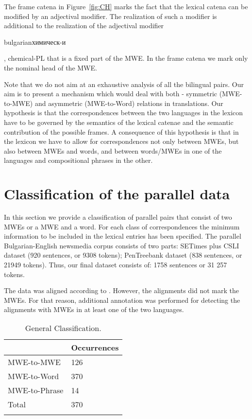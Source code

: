 \documentclass[output=paper]{langsci/langscibook}
\begin{document}
The frame catena in Figure~\ref{fig:CH} marks the fact that the lexical catena
can be modified by an adjectival modifier. The realization of such a modifier is additional to the realization of the adjectival modifier 
\begin{otherlanguage*}{bulgarian}химическ-и\end{otherlanguage*}, chemical-\textsc{PL}
that is a fixed part of the MWE. In the frame catena we mark only the nominal head of the MWE.

Note that we do not aim at an exhaustive analysis of all the bilingual
pairs. Our aim is to present a mechanism which would deal with both -
symmetric (MWE-to-MWE) and asymmetric (MWE-to-Word) relations in
translations. Our hypothesis is that the correspondences between the two
languages in the lexicon have to be governed by the semantics of the lexical
catenae and the semantic contribution of the possible frames. A consequence
of this hypothesis is that in the lexicon we have to allow for correspondences
not only between MWEs, but also between MWEs and words, and between
words/MWEs in one of the languages and compositional phrases in the other.

\section{Classification of the parallel data}
\label{TheData}


In this section we provide a classification of parallel pairs that consist
of two MWEs or a MWE and a word. For each class of correspondences the
minimum information to be included in the lexical entries has been
specified.
The parallel Bulgarian-English newsmedia corpus consists of two parts: SETimes plus CSLI
dataset (920 sentences, or 9308 tokens); PenTreebank dataset (838 sentences,
or 21949 tokens). Thus, our final dataset consists of: 1758 sentences or 31
257 tokens.

The data was aligned according to \cite{Simov2011}. However, the
alignments did not mark the MWEs. For that reason, additional annotation was
performed for detecting the alignments with MWEs in at least one of the two
languages.

\begin{table}[ht]
\centering
\begin{tabular}{p{3.0cm}p{3.0cm}}
\lsptoprule
& \textbf{Occurrences}\\
\midrule
MWE-to-MWE & 126 \\%
MWE-to-Word & 370 \\%
MWE-to-Phrase & 14 \\\hline
Total & 370 \\%
\lspbottomrule
\end{tabular}
 \caption{General Classification.}
\end{table}
\end{document}
